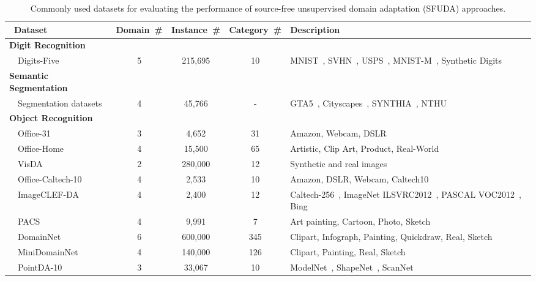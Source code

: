 \documentclass[10pt,journal,compsoc]{IEEEtran}
\begin{document}
\begin{table*}[!tbp]
	\setlength{\belowcaptionskip}{-2pt}
	\setlength{\abovecaptionskip}{-2pt}
	\setlength\abovedisplayskip{-2pt}
	\setlength\belowdisplayskip{-2pt}
	\scriptsize
	\renewcommand\arraystretch{1.2}
	\caption{Commonly used datasets for evaluating the performance of source-free unsupervised domain adaptation (SFUDA) approaches.}
	\centering
	\begin{tabular*}{1\textwidth}{@{\extracolsep{\fill}} l|c|c|c|l}
	\toprule
	~Dataset & Domain~\# & Instance~\# & Category~\# & Description \\
 \hline
    \cellcolor{gray!30}\textbf{Digit Recognition} \cellcolor{gray!30}& \cellcolor{gray!30}& \cellcolor{gray!30}& \cellcolor{gray!30}& \cellcolor{gray!30} \\
    ~~Digits-Five~\cite{peng2019momentDA} & 5 & 215,695 & 10 & MNIST~\cite{lecun1998gradient}, SVHN~\cite{netzer2011reading}, USPS~\cite{hull1994database}, MNIST-M~\cite{ganin2015unsupervised}, Synthetic Digits~\cite{ganin2015unsupervised}  \\
    
    \rowcolor{gray!30}\textbf{Semantic Segmentation} & & & &\\
    ~~Segmentation datasets & 4 & 45,766 & - & GTA5~\cite{richter2016playing}, Cityscapes~\cite{cordts2016cityscapes}, SYNTHIA~\cite{ros2016synthia}, NTHU~\cite{chen2017nomore} \\ %
 
    \rowcolor{gray!30}\textbf{Object Recognition} & & && \\
    ~~Office-31~\cite{saenko2010adapting} & 3 & 4,652 & 31 & Amazon, Webcam, DSLR \\
    ~~Office-Home~\cite{venkateswara2017deep} & 4 & 15,500 & 65 & Artistic, Clip Art, Product, Real-World \\
    ~~VisDA~\cite{peng2017visda} & 2 & 280,000 & 12 & Synthetic and real images \\
    ~~Office-Caltech-10~\cite{gong2012geodesic} & 4 & 2,533 & 10 & Amazon, DSLR, Webcam, Caltech10 \\
    ~~ImageCLEF-DA~\cite{caputo2014imageclef} & 4 & 2,400 & 12 & Caltech-256~\cite{griffin2007caltech}, ImageNet ILSVRC2012~\cite{deng2009imagenet}, PASCAL VOC2012~\cite{everingham2010pascal}, Bing~\cite{bergamo2010exploiting} \\
    ~~PACS~\cite{li2017deeperDG} & 4 & 9,991 & 7 & Art painting, Cartoon, Photo, Sketch\\
    ~~DomainNet~\cite{peng2019momentDA} & 6 & 600,000 & 345 & Clipart, Infograph, Painting, Quickdraw, Real, Sketch \\
    ~~MiniDomainNet~\cite{zhou2021domain} & 4 & 140,000 & 126 & Clipart, Painting, Real, Sketch \\
    ~~PointDA-10~\cite{qin2019pointdan} & 3 & 33,067 & 10 & ModelNet~\cite{wu20153dshape}, ShapeNet~\cite{chang2015shapenet}, ScanNet~\cite{dai2017scannet} \\
    

\end{tabular*}
\end{table*}
\end{document}
